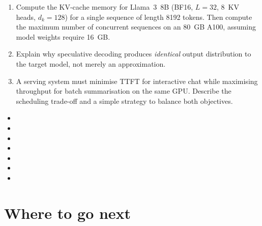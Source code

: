 \documentclass[11pt,a4paper]{article}
\begin{document}
	\begin{checkpoint}
		\begin{enumerate}
			\item Compute the KV-cache memory for Llama~3~8B (BF16, $L=32$, 8~KV heads, $d_k=128$) for a single sequence of length 8192 tokens. Then compute the maximum number of concurrent sequences on an 80~GB A100, assuming model weights require 16~GB.
			\item Explain why speculative decoding produces \emph{identical} output distribution to the target model, not merely an approximation.
			\item A serving system must minimise TTFT for interactive chat while maximising throughput for batch summarisation on the same GPU. Describe the scheduling trade-off and a simple strategy to balance both objectives.
		\end{enumerate}
	\end{checkpoint}

	\begin{sourcesbox}
		\small
		\begin{itemize}[nosep]
			\item {}
			\item {}
			\item {}
			\item {}
			\item {}
			\item {}
			\item {}
		\end{itemize}
	\end{sourcesbox}

	\clearpage
	\section*{Where to go next}
	
\end{document}
